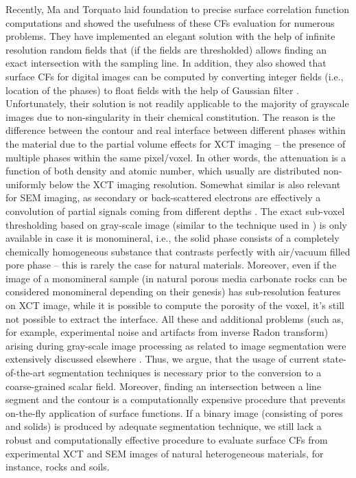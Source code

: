 \documentclass[reprint,amsmath,amssymb,aps,pre,showkeys,showpacs]{revtex4-1}
\begin{document}
Recently, Ma and Torquato \cite{ma2018SS} laid foundation to precise surface
correlation function computations and showed the usefulness of these CFs
evaluation for numerous problems. They have implemented an elegant solution with
the help of infinite resolution random fields that (if the fields are
thresholded) allows finding an exact intersection with the sampling line. In
addition, they also showed that surface CFs for digital images can be computed
by converting integer fields (i.e., location of the phases) to float fields with
the help of Gaussian filter \cite{ma2018SS}. Unfortunately, their solution is
not readily applicable to the majority of grayscale images due to
non-singularity in their chemical constitution. The reason is the difference
between the contour and real interface between different phases within the
material due to the partial volume effects \cite{Wildenschild_Sheppard} for XCT
imaging -- the presence of multiple phases within the same pixel/voxel. In other
words, the attenuation is a function of both density and atomic number, which
usually are distributed non-uniformly below the XCT imaging resolution. Somewhat
similar is also relevant for SEM imaging, as secondary or back-scattered
electrons are effectively a convolution of partial signals coming from different
depths \cite{Bultreys_review}. The exact sub-voxel thresholding based on
gray-scale image (similar to the technique used in \cite{ma2018SS}) is only
available in case it is monomineral, i.e., the solid phase consists of a
completely chemically homogeneous substance that contrasts perfectly with
air/vacuum filled pore phase -- this is rarely the case for natural
materials. Moreover, even if the image of a monomineral sample (in natural
porous media carbonate rocks can be considered monomineral depending on their
genesis) has sub-resolution features on XCT image, while it is possible to
compute the porosity of the voxel, it's still not possible to extract the
interface. All these and additional problems (such as, for example, experimental
noise and artifacts from inverse Radon transform) arising during gray-scale
image processing as related to image segmentation were extensively discussed
elsewhere \cite{NNseg}.
Thus, we argue, that the usage of current
state-of-the-art segmentation techniques is necessary prior to the conversion
to a coarse-grained scalar field. Moreover, finding an intersection between a
line segment and the contour is a computationally expensive procedure that
prevents on-the-fly application of surface functions. If a binary image
(consisting of pores and solids) is produced by adequate segmentation technique,
we still lack a robust and computationally effective procedure to evaluate
surface CFs from experimental XCT and SEM images of natural heterogeneous
materials, for instance, rocks and soils.
\end{document}
